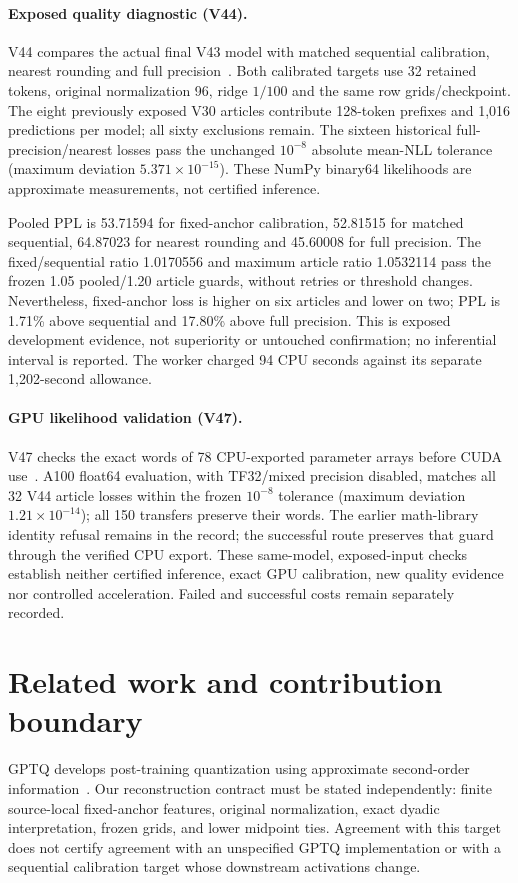\documentclass[10pt,twocolumn,letterpaper]{article}
\begin{document}
\paragraph{Exposed quality diagnostic (V44).}
V44 compares the actual final V43 model with matched sequential calibration,
nearest rounding and full precision~\cite{v44}. Both calibrated targets use
32 retained tokens, original normalization 96, ridge $1/100$ and the same row
grids/checkpoint. The eight previously exposed V30 articles contribute 128-token
prefixes and 1,016 predictions per model; all sixty exclusions remain.
The sixteen historical full-precision/nearest losses pass the unchanged
$10^{-8}$ absolute mean-NLL tolerance (maximum deviation
$5.371\times10^{-15}$). These NumPy binary64 likelihoods are approximate
measurements, not certified inference.

Pooled PPL is 53.71594 for fixed-anchor calibration, 52.81515 for matched
sequential, 64.87023 for nearest rounding and 45.60008 for full precision.
The fixed/sequential ratio 1.0170556 and maximum article ratio 1.0532114 pass
the frozen 1.05 pooled/1.20 article guards, without retries or threshold changes.
Nevertheless, fixed-anchor loss is higher on six articles and lower on two;
PPL is 1.71\% above sequential and 17.80\% above full precision. This is exposed
development evidence, not superiority or untouched confirmation; no inferential
interval is reported. The worker charged 94 CPU seconds against its separate
1,202-second allowance.

\paragraph{GPU likelihood validation (V47).}
V47 checks the exact words of 78 CPU-exported parameter arrays before CUDA
use~\cite{v47}. A100 float64 evaluation, with TF32/mixed precision disabled,
matches all 32 V44 article losses within the frozen $10^{-8}$ tolerance
(maximum deviation $1.21\times10^{-14}$); all 150 transfers preserve their words.
The earlier math-library identity refusal remains in the record; the successful
route preserves that guard through the verified CPU export. These same-model,
exposed-input checks establish neither certified inference, exact GPU calibration,
new quality evidence nor controlled acceleration. Failed and successful costs
remain separately recorded.

\section{Related work and contribution boundary}
GPTQ develops post-training quantization using approximate second-order
information~\cite{gptq}. Our reconstruction contract must be stated independently:
finite source-local fixed-anchor features, original normalization, exact dyadic
interpretation, frozen grids, and lower midpoint ties. Agreement with this target
does not certify agreement with an unspecified GPTQ implementation or with a
sequential calibration target whose downstream activations change.
\end{document}
